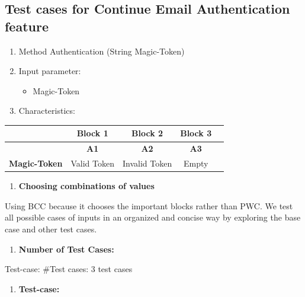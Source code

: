\subsection*{Test cases for Continue Email Authentication feature}

\begin{enumerate}
    \item Method Authentication (String Magic-Token)
    \item Input parameter:
    \begin{itemize}
        \item Magic-Token
    \end{itemize}
    \item Characteristics:
\end{enumerate}

\begin{table}[h!]
    \centering
    \begin{tabular}{|c|c|c|c|c|}
    \hline
    \textbf{} & \textbf{Block 1} & \textbf{Block 2} & \textbf{Block 3}  \\
    \hline
    \textbf{} & \textbf{A1} & \textbf{A2} & \textbf{A3}  \\
    \hline
    \textbf{Magic-Token} & Valid Token & Invalid Token & Empty \\
    \hline
    \end{tabular}
    \end{table}
    

\begin{enumerate}[resume]
    \item \textbf{Choosing combinations of values}
\end{enumerate}

\noindent
Using BCC because it chooses the important blocks rather than PWC. We test all possible cases of inputs in an organized and concise way by exploring the base case and other test cases.

\begin{enumerate}[resume]
    \item \textbf{Number of Test Cases:}
\end{enumerate}

\noindent
Test-case: \#Test cases: 3 test cases

\begin{enumerate}[resume]
    \item \textbf{Test-case:}
\end{enumerate}

